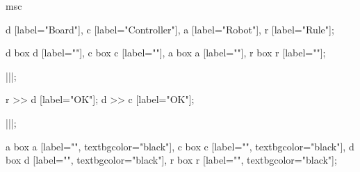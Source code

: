
\begin{msc}
msc
{

d [label="Board"],
c [label="Controller"],
a [label="Robot"],
r [label="Rule"];

d box d [label=""],
c box c [label=""],
a box a [label=""],
r box r [label=""];

|||;

r >> d [label="OK"];
d >> c [label="OK"];

|||;

a box a [label="", textbgcolor="black"],
c box c [label="", textbgcolor="black"],
d box d [label="", textbgcolor="black"],
r box r [label="", textbgcolor="black"];

}
\end{msc}
